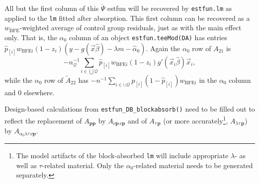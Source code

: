 \documentclass{article}
\begin{document}
All but the first column of this $\acute{\Psi}$ estfun will be
recovered by \texttt{estfun.lm} as applied to the \texttt{lm} fitted
after absorption.  This first column can be recovered as a
$w_{\text{BFE}}$-weighted average of control group residuals, just as
with the main effect only. That is, the 
$\alpha_{0}$ column of an object \texttt{estfun.teeMod(DA)} has entries
$\hat{p}_{[i]}w_{\text{BFE}i}(1-z_{i})(y - g(\vec{x}\hat{\beta})
-{\lambda}m -
\hat{\alpha}_{0})$. Again the $\alpha_{0}$ row of $A_{21}$ is 
\begin{equation*}
  -n_{\mathcal{Q}}^{-1}\sum_{i\in \bigcup\mathcal{Q} }
  \hat{p}_{[i]}w_{\text{BFE}i} (1-z_{i})g'(\vec{x}_{i}\hat{\beta}) \vec{x}_{i},
\end{equation*}
while the
$\alpha_{0}$ row of $\tilde{A}_{22}$ has $-n^{-1}\sum_{i \in \cup \mathcal{Q}}
p_{[i]}(1-\hat{p}_{[i]})w_{\text{BFE}i}$ in the
$\alpha_{0}$ column and 0 elsewhere.

Design-based calculations from
\texttt{estfun\_DB\_blockabsorb()} need to be filled out to reflect
the replacement of $A_{\mathbf{p}\mathbf{p}}$ by $A_{\nu \mathbf{p}\,
  \nu\mathbf{p}}$ and of $A_{\tau\,\mathbf{p}}$ (or more accurately\footnote{%
The model artifacts of the block-absorbed \texttt{lm} will include
appropriate $\lambda$- as well as $\tau$-related
material. Only the $\alpha_{0}$-related material needs to be generated
separately.
}, $A_{\lambda\tau\,\mathbf{p}}$) by $A_{\alpha_{0}\lambda \tau\, \nu\mathbf{p}}$.
\end{document}
